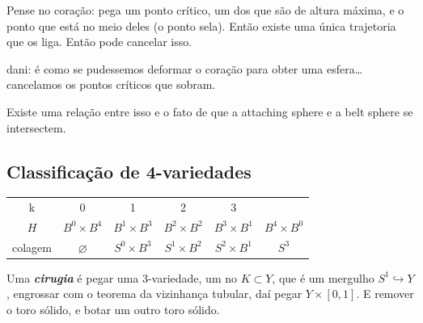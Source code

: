 \begin{example}\leavevmode
Pense no coração: pega um ponto crítico, um dos que são de altura máxima, e o ponto que está no meio deles (o ponto sela). Então existe uma única trajetoria que os liga. Então pode cancelar isso.

{\color{7}dani: é como se pudessemos deformar o coração para obter uma esfera… cancelamos os pontos críticos que sobram.}
\end{example}

Existe uma relação entre isso e o fato de que a attaching sphere e a belt sphere se intersectem.

\subsection{Classificação de 4-variedades}


\begin{table}[H]
	\centering
	\begin{tabular}{c|c|c|c|c|c}
		k & 0 & 1 & 2 & 3 &\\
		\(H\) & \(B^0 \times B^4\) & \(B^1 \times B^3\) & \(B^2 \times B^2\) &\(B^3 \times B^1\)& \(B^4 \times B^0\)\\
		colagem & \(\varnothing\)&\(S^0 \times B^3\)&\(S^1 \times B^2\)& \(S^2 \times B^1\)& \(S^3\)
	\end{tabular}
\end{table}

\begin{defn}\leavevmode
	Uma \textit{\textbf{cirugia}} é pegar uma 3-variedade, um no  \(K \subset Y\), que é um mergulho \(S^1 \hookrightarrow Y\), engrossar com o teorema da vizinhança tubular, daí pegar \(Y \times [0,1]\). E remover o toro sólido, e botar um outro toro sólido.
\end{defn}



